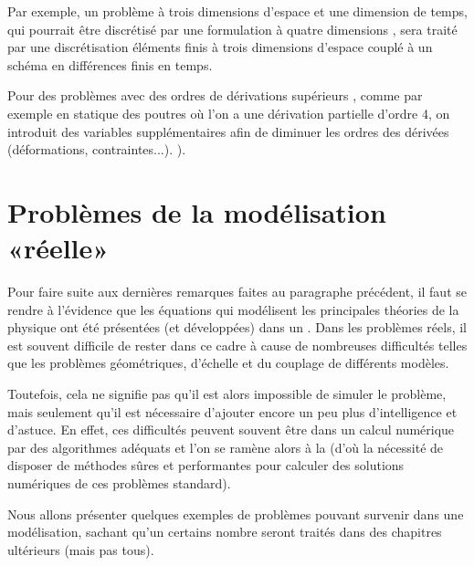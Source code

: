 Par exemple, un problème à trois dimensions d'espace et une dimension de temps, qui pourrait être discrétisé par une formulation à quatre dimensions , sera traité par une discrétisation éléments finis à trois dimensions d'espace couplé à un schéma en différences finis en temps.

Pour des problèmes avec des ordres de dérivations supérieurs , comme par exemple en statique des poutres où l'on a une dérivation partielle d'ordre 4, on introduit des variables supplémentaires afin de diminuer les ordres des dérivées (déformations, contraintes...). ).


\medskip
\section{Problèmes de la modélisation «réelle»}

Pour faire suite aux dernières remarques faites au paragraphe précédent, il faut se rendre à l'évidence que les équations qui modélisent les principales théories de la physique ont été présentées (et développées) dans un .
Dans les problèmes réels, il est souvent difficile de rester dans ce cadre à cause de nombreuses difficultés telles que les problèmes géométriques, d'échelle et du couplage de différents modèles.

Toutefois, cela ne signifie pas qu'il est alors impossible de simuler le problème, mais seulement qu'il est nécessaire d'ajouter encore un peu plus d'intelligence et d'astuce. En effet, ces difficultés peuvent souvent être  dans un calcul numérique par des algorithmes adéquats et l'on se ramène alors à la  (d'où la nécessité de disposer de méthodes sûres et performantes pour calculer des solutions numériques de ces problèmes standard).

\medskip
Nous allons présenter quelques exemples de problèmes pouvant survenir dans une modélisation, sachant qu'un certains nombre seront traités dans des chapitres ultérieurs (mais pas tous).

\medskip
